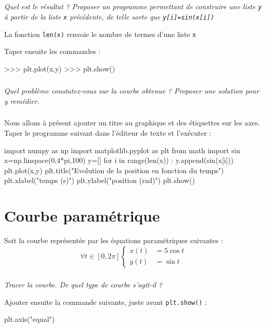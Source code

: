 \documentclass[10pt]{article}
\begin{document}
\subparagraph{}
\textit{Quel est le résultat ? Proposer un programme permettant de construire une liste \texttt{y} à partir de la liste \texttt{x} précédente, de telle sorte que \texttt{y[i]=sin(x[i])}}

\begin{rem}
La fonction \texttt{len(x)} renvoie le nombre de termes d'une  liste \texttt{x}
\end{rem}

Taper ensuite les commandes :
\begin{py}
\begin{python}
>>> plt.plot(x,y)
>>> plt.show()
\end{python}
\end{py}

\subparagraph{}
\textit{Quel problème constatez-vous sur la courbe obtenue ? Proposer une solution pour y remédier.}

\subparagraph{}
Nous allons à présent ajouter un titre au graphique et des étiquettes sur les axes. Taper le programme suivant dans l'éditeur de texte et l'exécuter :
\begin{py}
\begin{python}
import numpy as np
import matplotlib.pyplot as plt
from math import sin
x=np.linspace(0,4*pi,100)
y=[]
for i in range(len(x)) :
	y.append(sin(x[i]))
plt.plot(x,y)
plt.title("Evolution de la position en fonction du temps")
plt.xlabel("temps (s)")
plt.ylabel("position (rad)")
plt.show()
\end{python}
\end{py}



\section{Courbe paramétrique}
\setcounter{subparagraph}{0}
Soit la courbe représentée par les équations paramétriques suivantes :
\[
\forall t \in [0,2\pi]
\left\lbrace
\begin{aligned}
x(t)&=5 \cos t \\
y(t)&=\sin t
\end{aligned}
\right.
\]

\subparagraph{}
\textit{Tracer la courbe. De quel type de courbe s'agit-il ?}


\begin{py}
Ajouter ensuite la commande suivante, juste avant \texttt{plt.show()} :
\begin{python}
plt.axis("equal")
\end{python}
\end{py}
\end{document}
